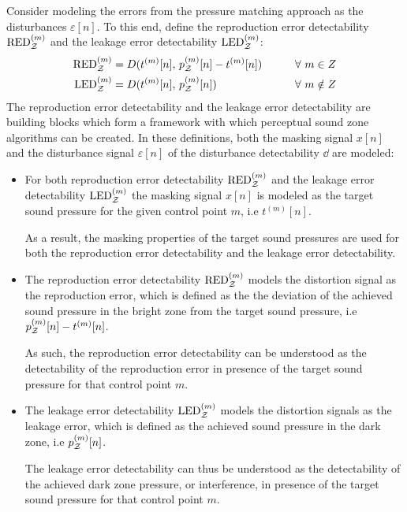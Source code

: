 Consider modeling the errors from the pressure matching approach as the disturbances $\varepsilon[n]$.
To this end, define the reproduction error detectability $\text{RED}^{(m)}_{\mathcal{Z}}$ 
and the leakage error detectability $\text{LED}^{(m)}_{\mathcal{Z}}$:
\begin{alignat}{2}
    \text{RED}^{(m)}_{\mathcal{Z}} &= D(t^{(m)}[n],\,p_{\mathcal{Z}}^{(m)}[n] - t^{(m)}[n]) \qquad&& \forall\,\, m\in Z 
        \label{eq:sound_zone:approach_selection:RED}\\
    \text{LED}^{(m)}_{\mathcal{Z}} &= D(t^{(m)}[n],\,p_{\mathcal{Z}}^{(m)}[n]) \qquad&& \forall\,\, m\notin Z 
        \label{eq:sound_zone:approach_selection:LED} 
\end{alignat}
The reproduction error detectability and the leakage error detectability are building blocks which form a framework
with which perceptual sound zone algorithms can be created.
In these definitions, both the masking signal $x[n]$ and the disturbance signal $\varepsilon[n]$ of the 
disturbance detectability $\dd$ are modeled:  

\begin{itemize}
    \item 
        For both reproduction error detectability $\text{RED}^{(m)}_{\mathcal{Z}}$ 
        and the leakage error detectability $\text{LED}^{(m)}_{\mathcal{Z}}$ the masking signal $x[n]$ is modeled as the target 
        sound pressure for the given control point $m$, i.e $t^{(m)}[n]$. 

        As a result, the masking properties of the target sound pressures are used for both 
        the reproduction error detectability and the leakage error detectability.
    \item 
        The reproduction error detectability $\text{RED}^{(m)}_{\mathcal{Z}}$ models the distortion signal 
        as the reproduction error, which is defined as the 
        the deviation of the achieved sound pressure in the bright zone from the target sound pressure, i.e 
        $p_{\mathcal{Z}}^{(m)}[n] - t^{(m)}[n]$. 

        As such, the reproduction error detectability  
        can be understood as the detectability of the reproduction error in presence of the target sound pressure for that 
        control point $m$.
    \item 
        The leakage error detectability $\text{LED}^{(m)}_{\mathcal{Z}}$ models the distortion signals
        as the leakage error, which is defined as the achieved sound pressure in the dark zone, i.e $p_{\mathcal{Z}}^{(m)}[n]$.  

        The leakage error detectability can thus be understood as the detectability of the achieved dark zone pressure, or 
        interference, in presence of the target sound pressure for that control point $m$.
\end{itemize}

